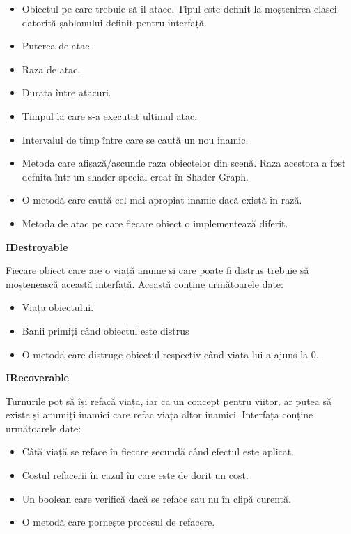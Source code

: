 \documentclass[12pt, a4paper]{article}
\begin{document}
	\begin{itemize}
		\item Obiectul pe care trebuie să îl atace. Tipul este definit la moștenirea clasei datorită șablonului definit pentru interfață.
		\item Puterea de atac.
		\item Raza de atac.
		\item Durata între atacuri.
		\item Timpul la care s-a executat ultimul atac.
		\item Intervalul de timp între care se caută un nou inamic.
		\item Metoda care afișază/ascunde raza obiectelor din scenă. Raza acestora a fost defnita într-un shader special creat în Shader Graph.
		\item O metodă care caută cel mai apropiat inamic dacă există în rază.
		\item Metoda de atac pe care fiecare obiect o implementează diferit.
	\end{itemize}
	\bigskip
	
	\textbf{IDestroyable}
	
	Fiecare obiect care are o viață anume și care poate fi distrus trebuie să moștenească această interfață. Această conține următoarele date:
	
	\begin{itemize}
		\item Viața obiectului.
		\item Banii primiți când obiectul este distrus
		\item O metodă care distruge obiectul respectiv când viața lui a ajuns la 0.
	\end{itemize}
	\bigskip
	
	\textbf{IRecoverable}
	
	Turnurile pot să își refacă viața, iar ca un concept pentru viitor, ar putea să existe și anumiți inamici care refac viața altor inamici. Interfața conține următoarele date:
	
	\begin{itemize}
		\item Câtă viață se reface în fiecare secundă când efectul este aplicat.
		\item Costul refacerii în cazul în care este de dorit un cost.
		\item Un boolean care verifică dacă se reface sau nu în clipă curentă.
		\item O metodă care pornește procesul de refacere.
	\end{itemize}
	
\end{document}

